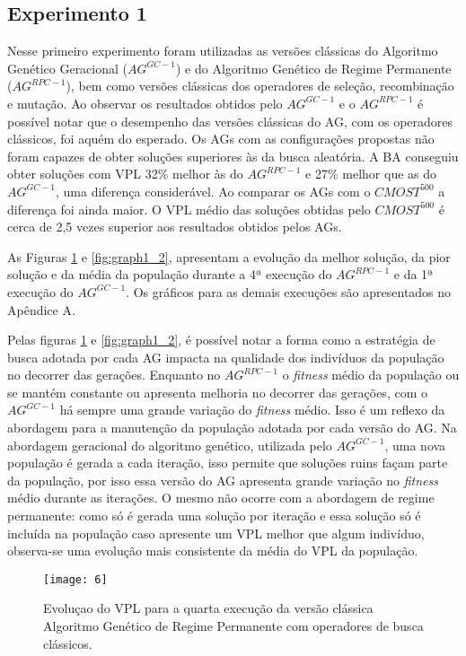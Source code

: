 \subsection{Experimento 1}
\label{ch:5_Experimento1}
Nesse primeiro experimento foram utilizadas as versões clássicas do Algoritmo Genético Geracional ($AG^{GC-1}$) e do Algoritmo Genético de Regime Permanente ($AG^{RPC-1}$), bem como versões clássicas dos operadores de seleção, recombinação e mutação. Ao observar os resultados obtidos pelo $AG^{GC-1}$ e o $AG^{RPC-1}$ é possível notar que o desempenho das versões clássicas do AG, com os operadores clássicos, foi aquém do esperado. Os AGs com as configurações propostas não foram capazes de obter soluções superiores às da busca aleatória.  A BA conseguiu obter soluções com VPL 32\% melhor às do $AG^{RPC-1}$ e 27\% melhor que as do $AG^{GC-1}$, uma diferença considerável. Ao comparar os AGs com o $CMOST^{500}$ a diferença foi ainda maior. O VPL médio das soluções obtidas pelo $CMOST^{500}$ é cerca de 2,5 vezes superior aos resultados obtidos pelos AGs.

As Figuras \ref{fig:graph1_1} e \ref{fig:graph1_2}, apresentam a evolução da melhor solução, da pior solução e da média da população durante a 4ª execução do $AG^{RPC-1}$ e da 1ª execução do $AG^{GC-1}$. Os gráficos para as demais execuções são apresentados no Apêndice A.

Pelas figuras \ref{fig:graph1_1} e \ref{fig:graph1_2}, é possível notar a forma como a estratégia de busca adotada por cada AG impacta na qualidade dos indivíduos da população no decorrer das gerações. Enquanto no $AG^{RPC-1}$ o \textit{fitness} médio da população ou se mantém constante ou apresenta melhoria no decorrer das gerações, com o $AG^{GC-1}$ há sempre uma grande variação do \textit{fitness} médio. Isso é um reflexo da abordagem para a manutenção da população adotada por cada versão do AG. Na abordagem geracional do algoritmo genético, utilizada pelo $AG^{GC-1}$, uma nova população é gerada a cada iteração, isso permite que soluções ruins façam parte da população, por isso essa versão do AG apresenta grande variação no \textit{fitness} médio durante as iterações. O mesmo não ocorre com a abordagem de regime permanente: como só é gerada uma solução por iteração e essa solução só é incluída na população caso apresente um VPL melhor que algum indivíduo, observa-se uma evolução mais consistente da média do VPL da população.

\begin{figure}[htb]
    \texttt{[image: 6]}
    \caption{Evoluçao do VPL para a quarta execução da versão clássica Algoritmo Genético de Regime Permanente com operadores de busca clássicos.}
    \label{fig:graph1_1}
\end{figure}

